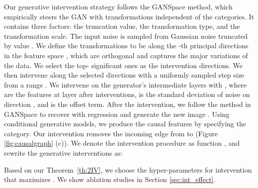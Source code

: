 \documentclass[final]{cvpr}
\begin{document}
Our generative intervention strategy follows the GANSpace \cite{hrknen2020ganspace} method, which empirically steers the GAN with transformations independent of the categories. It contains three factors: the truncation value, the transformation type, and the transformation scale. The input noise  is sampled from Gaussian noise truncated by value  \cite{BigGAN}.
We define the transformations to be along the -th principal directions  in the feature space \cite{hrknen2020ganspace}, which are orthogonal and captures the major variations of the data. We select the top- significant ones  as the intervention directions. We then intervene along the selected directions with a uniformly sampled step size  from a range . We intervene on the generator's intermediate layers with , where  are the features at layer  after interventions,  is the standard deviation of noise on direction , and  is the offset term. After the intervention, we follow the method in GANSpace  \cite{hrknen2020ganspace} to recover  with regression and generate the new image .
 Using conditional generative models, we produce the causal features  by specifying the category. Our intervention removes the incoming edge from  to  (Figure \ref{fig:causalgraph} (c)). We denote the intervention procedure as function , and rewrite the generative interventions as:
 
 Based on our Theorem~\ref{th:2IV}, we choose the hyper-parameters  for intervention  that maximizes . We show ablation studies in Section \ref{sec:int_effect}. 
 
 
\end{document}

